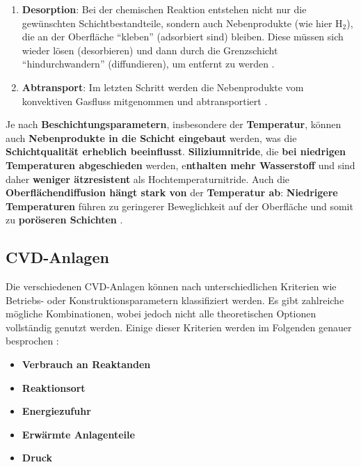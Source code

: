 \documentclass{article} %
\begin{document}
\begin{enumerate}
    \item \textbf{Desorption}: Bei der chemischen Reaktion entstehen nicht nur die gewünschten Schichtbestandteile, sondern auch Nebenprodukte (wie hier H$_2$), die an der Oberfläche ``kleben'' (adsorbiert sind) bleiben. Diese müssen sich wieder lösen (desorbieren) und dann durch die Grenzschicht ``hindurchwandern'' (diffundieren), um entfernt zu werden \cite{keplinger2024CVD}.
    \item \textbf{Abtransport}: Im letzten Schritt werden die Nebenprodukte vom konvektiven Gasfluss mitgenommen und abtransportiert \cite{keplinger2024CVD}.
\end{enumerate}

Je nach \textbf{Beschichtungsparametern}, insbesondere der \textbf{Temperatur}, können auch \textbf{Nebenprodukte in die Schicht eingebaut} werden, was die \textbf{Schichtqualität erheblich beeinflusst}. \textbf{Siliziumnitride}, die \textbf{bei niedrigen Temperaturen abgeschieden} werden, e\textbf{nthalten mehr Wasserstoff} und sind daher \textbf{weniger ätzresistent} als Hochtemperaturnitride. Auch die \textbf{Oberflächendiffusion hängt stark von} der \textbf{Temperatur ab}: \textbf{Niedrigere Temperaturen} führen zu geringerer Beweglichkeit auf der Oberfläche und somit zu \textbf{poröseren Schichten} \cite{keplinger2024CVD}.





\vspace{1em}

\subsection{CVD-Anlagen} %

Die verschiedenen CVD-Anlagen können nach unterschiedlichen Kriterien wie Betriebs- oder Konstruktionsparametern klassifiziert werden. Es gibt zahlreiche mögliche Kombinationen, wobei jedoch nicht alle theoretischen Optionen vollständig genutzt werden. Einige dieser Kriterien werden im Folgenden genauer besprochen \cite{keplinger2024CVD}:

\begin{itemize}
    \item \textbf{Verbrauch an Reaktanden}
    \item \textbf{Reaktionsort}
    \item \textbf{Energiezufuhr}
    \item \textbf{Erwärmte Anlagenteile}
    \item \textbf{Druck}
\end{itemize}
\end{document}
